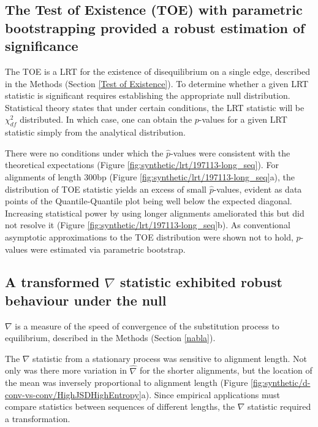 \subsection{The Test of Existence (TOE) with parametric bootstrapping provided a robust estimation of significance}
\label{TOE_results}

The \acrshort{TOE} is a \acrshort{LRT} for the existence of disequilibrium on a single edge, described in the Methods (Section \ref{Test of Existence}).  
To determine whether a given LRT statistic is significant requires establishing the appropriate null distribution. Statistical theory states that under certain conditions, the LRT statistic will be $\chi^2_{df}$ distributed. In which case, one can obtain the $p$-values for a given LRT statistic simply from the analytical distribution.

There were no conditions under which the $\hat p$-values were consistent with the theoretical expectations (Figure \ref{fig:synthetic/lrt/197113-long_seq}). For alignments of length 300bp (Figure \ref{fig:synthetic/lrt/197113-long_seq}a), the distribution of TOE statistic yields an excess of small $\hat p$-values, evident as data points of the Quantile-Quantile plot being well below the expected diagonal. Increasing statistical power by using longer alignments ameliorated this but did not resolve it (Figure \ref{fig:synthetic/lrt/197113-long_seq}b). As conventional asymptotic approximations to the TOE distribution were shown not to hold, $p$-values were estimated via parametric bootstrap.  



\subsection{A transformed $\nabla$ statistic exhibited robust behaviour under the null}
\label{nabla_results}

$\nabla$ is a measure of the speed of convergence of the substitution process to equilibrium, described in the Methods (Section \ref{nabla}). 

The $\nabla$ statistic from a stationary process was sensitive to alignment length. Not only was there more variation in $\hat \nabla$ for the shorter alignments, but the location of the mean was inversely proportional to alignment length (Figure \ref{fig:synthetic/d-conv-vs-conv/HighJSDHighEntropy}a). Since empirical applications must compare statistics between sequences of different lengths, the $\nabla$ statistic required a transformation. 


